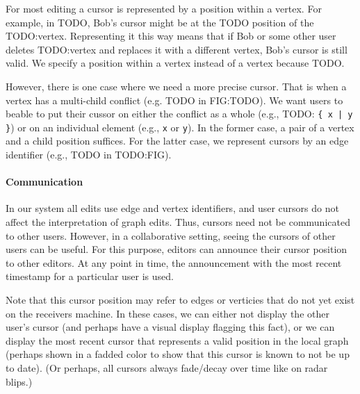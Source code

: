 For most editing a cursor is represented by a position within a vertex.
For example, in TODO, Bob's cursor might be at the TODO position of the TODO:vertex.
Representing it this way means that if Bob or some other user deletes TODO:vertex
and replaces it with a different vertex, Bob's cursor is still valid.
We specify a position within a vertex instead of a vertex because TODO.

However, there is one case where we need a more precise cursor.
That is when a vertex has a multi-child conflict (e.g. TODO in FIG:TODO).
We want users to beable to put their cussor on either the conflict as a whole
(e.g., TODO: \texttt{\{ x | y \}})
or on an individual element (e.g., \texttt{x} or \texttt{y}).
In the former case, a pair of a vertex and a child position suffices.
For the latter case, we represent cursors by an edge identifier (e.g., TODO in TODO:FIG).

\paragraph{Communication}

In our system all edits use edge and vertex identifiers, and user
cursors do not affect the interpretation of graph edits.
Thus, cursors need not be communicated to other users.
However, in a collaborative setting, seeing the cursors of other users
can be useful.
For this purpose, editors can announce their cursor position to other editors.
At any point in time, the announcement
with the most recent timestamp
for a particular user
is used.

Note that this cursor position may refer to edges or verticies that
do not yet exist on the receivers machine.
In these cases, we can either not display the other user's cursor (and perhaps
have a visual display flagging this fact), or we can display the most recent
cursor that represents a valid position in the local graph (perhaps
shown in a fadded color to show that this cursor is known to not be up to date).
(Or perhaps, all cursors always fade/decay over time like on radar blips.)
